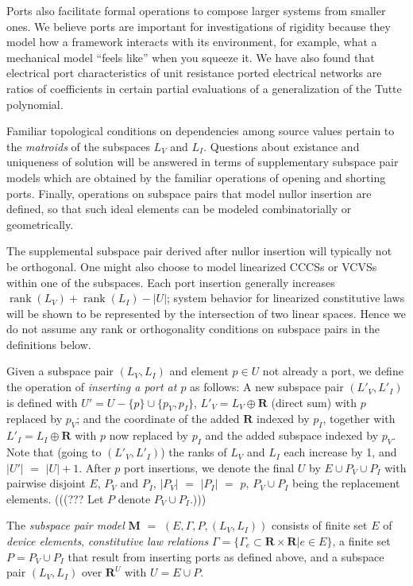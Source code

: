 \documentclass{article}
\def\Reals{\ensuremath{\mathbf R}}
\DeclareMathOperator{\rank}{rank}
\newcommand{\extra}[1]{{\small{#1}}}
\begin{document}
\extra{ Ports also facilitate formal operations to compose larger systems
from smaller ones.  We believe ports are important for investigations of
rigidity because they model how a framework interacts with its environment,
for example, what a mechanical model ``feels like'' when you squeeze it.
We have also found that electrical port characteristics of unit resistance
ported electrical networks are ratios of coefficients in certain 
partial evaluations 
of a generalization of the Tutte polynomial\cite{sdcPorted}.}


Familiar topological conditions on dependencies among source values
pertain to the \textit{matroids} of the subspaces $L_V$ and $L_I$.
Questions about existance and uniqueness of solution
will be answered in terms of supplementary subspace pair models
which are obtained by the familiar operations of opening and shorting ports.
Finally, operations on subspace pairs that model nullor insertion are
defined, so that such ideal elements can be modeled combinatorially or
geometrically.  

The supplemental subspace pair derived after nullor 
insertion will typically not be orthogonal.  One might also choose to
model linearized CCCSs or VCVSs within one of the subspaces.  
Each port insertion generally increases $\rank(L_V)+\rank(L_I)-|U|$;
system behavior for linearized constitutive laws will be shown to be
represented by the intersection of two linear spaces.
Hence we do not assume any rank or orthogonality conditions on subspace 
pairs in the definitions below.

Given a subspace pair $(L_V, L_I)$ and element $p\in U$ not already a port, 
we define the 
operation of \textit{inserting a port at  $p$} 
as follows: A new subspace pair $(L'_V, L'_I)$
is defined with $U'=U-\{p\}\cup\{p_V,p_I\}$, $L'_V=L_V\oplus\Reals$ (direct 
sum) with $p$ replaced by $p_V$;
and the coordinate of the added $\mathbf{R}$ 
indexed by $p_I$, together with
$L'_I=L_I\oplus\Reals$ with $p$ now replaced by $p_I$
and the added subspace indexed by $p_V$.
Note that (going to $(L'_V, L'_I)$) the ranks of
$L_V$ and $L_I$ each increase by 1, and $|U'|$ $=$ $|U|+1$.  After $p$ port
insertions, we denote the final $U$ by $E\cup P_V \cup P_I$ 
with pairwise disjoint
$E$, $P_V$ and $P_I$, $|P_V|$ $=$ $|P_I|$ $=$ $p$, $P_V\cup P_I$ being the 
replacement elements.  (((??? Let $P$ denote $P_V \cup P_I$.)))

The \textit{subspace pair model} $\mathbf{M}$ $=$ 
$(E, \Gamma, P, (L_V, L_I))$ consists of finite set $E$ of 
\textit{device elements}, \textit{constitutive law relations}
$\Gamma = \{\Gamma_e\subset\Reals\times\Reals | e \in E\}$, a finite set
$P=P_V \cup P_I$ that result from inserting ports as defined above, 
and a subspace pair $(L_V, L_I)$ over $\Reals^U$ with $U=E\cup P$.
\end{document}
